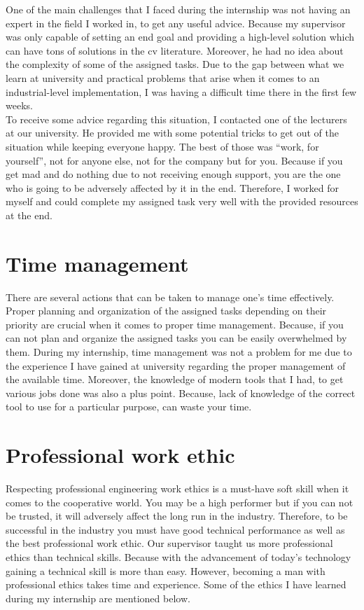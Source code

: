 \documentclass[a4paper,12pt]{report}%
\begin{document}
One of the main challenges that I faced during the internship was not having an expert in the field I worked in, to get any useful advice. Because my supervisor was only capable of setting an end goal and providing a high-level solution which can have tons of solutions in the \ac{cv} literature. Moreover, he had no idea about the complexity of some of the assigned tasks. Due to the gap between what we learn at university and practical problems that arise when it comes to an industrial-level implementation, I was having a difficult time there in the first few weeks.\\

To receive some advice regarding this situation, I contacted one of the lecturers at our university. He provided me with some potential tricks to get out of the situation while keeping everyone happy. The best of those was ``work, for yourself'', not for anyone else, not for the company but for you. Because if you get mad and do nothing due to not receiving enough support, you are the one who is going to be adversely affected by it in the end. Therefore, I worked for myself and could complete my assigned task very well with the provided resources at the end.  



\section{Time management} 

There are several actions that can be taken to manage one's time effectively.  Proper planning and organization of the assigned tasks depending on their priority are crucial when it comes to proper time management. Because, if you can not plan and organize the assigned tasks you can be easily overwhelmed by them. During my internship, time management was not a problem for me due to the experience I have gained at university regarding the proper management of the available time. Moreover, the knowledge of modern tools that I had, to get various jobs done was also a plus point. Because, lack of knowledge of the correct tool to use for a particular purpose, can waste your time.

\section{Professional work ethic}
Respecting professional engineering work ethics is a must-have soft skill when it comes to the cooperative world. You may be a high performer but if you can not be trusted, it will adversely affect the long run in the industry. Therefore, to be successful in the industry you must have good technical performance as well as the best professional work ethic. Our supervisor taught us more professional ethics than technical skills. Because with the advancement of today's technology gaining a technical skill is more than easy. However, becoming a man with professional ethics takes time and experience. Some of the ethics I have learned during my internship are mentioned below.
\end{document}
